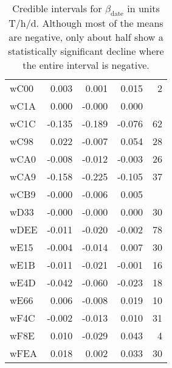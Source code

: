 \begin{table}[ht]
\begin{tabular}{lrrrr}
  wC00 & 0.003 & 0.001 & 0.015 &    2 \\ 
  wC1A & 0.000 & -0.000 & 0.000 &  \\ 
  wC1C & -0.135 & -0.189 & -0.076 &   62 \\ 
  wC98 & 0.022 & -0.007 & 0.054 &   28 \\ 
  wCA0 & -0.008 & -0.012 & -0.003 &   26 \\ 
  wCA9 & -0.158 & -0.225 & -0.105 &   37 \\ 
  wCB9 & -0.000 & -0.006 & 0.005 &  \\ 
  wD33 & -0.000 & -0.000 & 0.000 &   30 \\ 
  wDEE & -0.011 & -0.020 & -0.002 &   78 \\ 
  wE15 & -0.004 & -0.014 & 0.007 &   30 \\ 
  wE1B & -0.011 & -0.021 & -0.001 &   16 \\ 
  wE4D & -0.042 & -0.060 & -0.023 &   18 \\ 
  wE66 & 0.006 & -0.008 & 0.019 &   10 \\ 
  wF4C & -0.002 & -0.013 & 0.010 &   31 \\ 
  wF8E & 0.010 & -0.029 & 0.043 &    4 \\ 
  wFEA & 0.018 & 0.002 & 0.033 &   30 \\ 
   \hline
\end{tabular}
\endgroup
\caption{Credible intervals for $\beta_\text{date}$ in units T/h/d. Although most of the means are negative, only about half show a statistically significant decline where the entire interval is negative.} 
\label{tab:beta_date_all}
\end{table}
